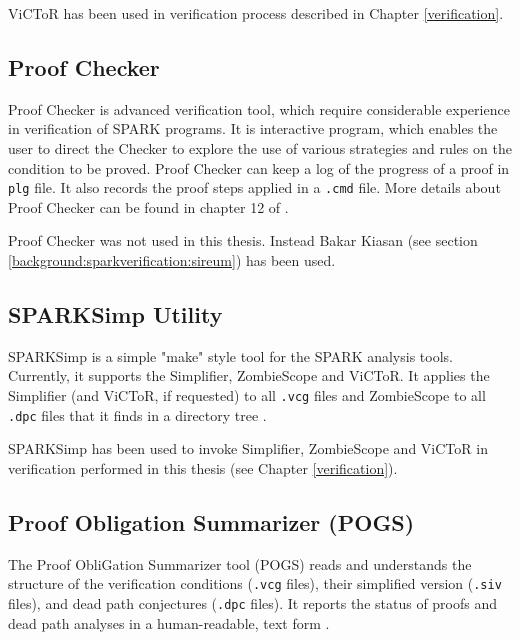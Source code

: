ViCToR has been used in verification process described in Chapter \ref{verification}.



\subsection{Proof Checker}
\label{background:sparkverification:proofchecker}

Proof Checker is advanced verification tool, which require considerable experience in verification of SPARK programs. It is interactive program, which enables the user to direct the Checker to explore the use of various strategies and rules on the condition to be proved. Proof Checker can keep a log of the progress of a proof in \lstinline{plg} file. It also records the proof steps applied in a \lstinline{.cmd} file. More details about Proof Checker can be found in chapter 12 of \cite{Barnes:Book}.

Proof Checker was not used in this thesis. Instead Bakar Kiasan (see section \ref{background:sparkverification:sireum}) has been used.



\subsection{SPARKSimp Utility}
\label{background:sparkverification:sparksimp}
SPARKSimp is a simple "make" style tool for the SPARK analysis tools. Currently, it supports the Simplifier, ZombieScope and ViCToR. It applies the Simplifier (and ViCToR, if requested) to all \lstinline{.vcg} files and ZombieScope to all \lstinline{.dpc} files that it finds in a directory tree \cite{SPARKSimp:Online}.

SPARKSimp has been used to invoke Simplifier, ZombieScope and ViCToR in verification performed in this thesis (see Chapter \ref{verification}).



\subsection{Proof Obligation Summarizer (POGS)}
\label{background:sparkverification:pogs}

The Proof ObliGation Summarizer tool (POGS) reads and understands the structure of the verification conditions (\lstinline{.vcg} files), their simplified version (\lstinline{.siv} files), and dead path conjectures (\lstinline{.dpc} files). It reports the status of proofs and dead path analyses in a human-readable, text form \cite{POGS:Online}.

